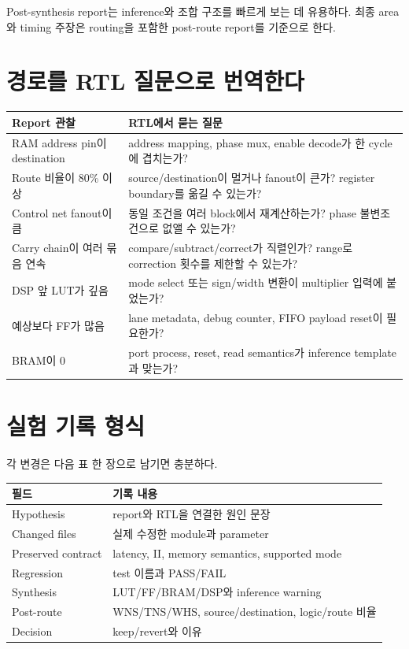 Post-synthesis report는 inference와 조합 구조를 빠르게 보는 데 유용하다. 최종
area와 timing 주장은 routing을 포함한 post-route report를 기준으로 한다.

\section{경로를 RTL 질문으로 번역한다}

\begin{longtable}{L{47mm}L{115mm}}
\toprule
Report 관찰 & RTL에서 묻는 질문 \\
\midrule
RAM address pin이 destination & address mapping, phase mux, enable decode가 한 cycle에 겹치는가? \\
Route 비율이 80\% 이상 & source/destination이 멀거나 fanout이 큰가? register boundary를 옮길 수 있는가? \\
Control net fanout이 큼 & 동일 조건을 여러 block에서 재계산하는가? phase 불변조건으로 없앨 수 있는가? \\
Carry chain이 여러 묶음 연속 & compare/subtract/correct가 직렬인가? range로 correction 횟수를 제한할 수 있는가? \\
DSP 앞 LUT가 깊음 & mode select 또는 sign/width 변환이 multiplier 입력에 붙었는가? \\
예상보다 FF가 많음 & lane metadata, debug counter, FIFO payload reset이 필요한가? \\
BRAM이 0 & port process, reset, read semantics가 inference template과 맞는가? \\
\bottomrule
\end{longtable}

\section{실험 기록 형식}

각 변경은 다음 표 한 장으로 남기면 충분하다.

\begin{longtable}{L{39mm}L{123mm}}
\toprule
필드 & 기록 내용 \\
\midrule
Hypothesis & report와 RTL을 연결한 원인 문장 \\
Changed files & 실제 수정한 module과 parameter \\
Preserved contract & latency, II, memory semantics, supported mode \\
Regression & test 이름과 PASS/FAIL \\
Synthesis & LUT/FF/BRAM/DSP와 inference warning \\
Post-route & WNS/TNS/WHS, source/destination, logic/route 비율 \\
Decision & keep/revert와 이유 \\
\bottomrule
\end{longtable}

